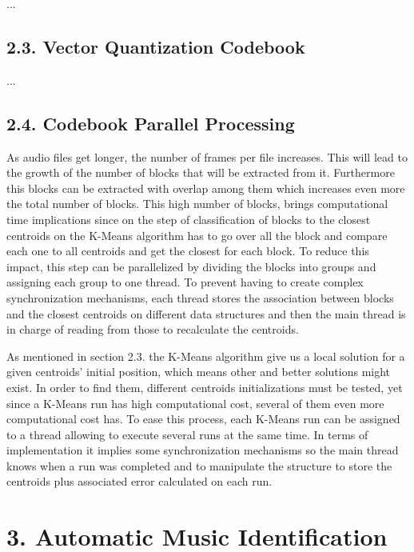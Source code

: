 \documentclass[12pt]{article}
\begin{document}
...

\subsection*{2.3. Vector Quantization Codebook}
\label{sec:vctQuantCB}

...

\subsection*{2.4. Codebook Parallel Processing}

As audio files get longer, the number of frames per file increases.
This will lead to the growth of the number of blocks that will be
extracted from it.
Furthermore this blocks can be extracted with overlap among them
which increases even more the total number of blocks.
This high number of blocks, brings computational time implications
since on the step of classification of blocks to the closest
centroids on the K-Means algorithm has to go over all the block and
compare each one to all centroids and get the closest for each block.
To reduce this impact, this step can be parallelized by dividing the
blocks into groups and assigning each group to one thread.
To prevent having to create complex synchronization mechanisms, each
thread stores the association between blocks and the closest
centroids on different data structures and then the main thread is in
charge of reading from those to recalculate the centroids.

As mentioned in section 2.3. the K-Means algorithm give us a local
solution for a given centroids' initial position, which means other
and better solutions might exist.
In order to find them, different centroids initializations must be
tested, yet since a K-Means run has high computational cost, several
of them even more computational cost has.
To ease this process, each K-Means run can be assigned to a thread
allowing to execute several runs at the same time.
In terms of implementation it implies some synchronization mechanisms
so the main thread knows when a run was completed and to manipulate
the structure to store the centroids plus associated error calculated
on each run.

\newpage
\section*{3. Automatic Music Identification}
\end{document}
